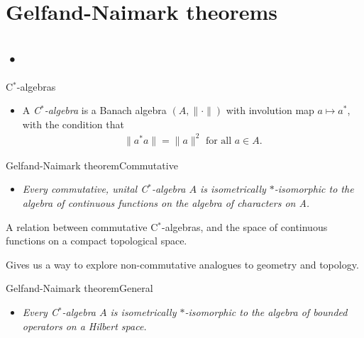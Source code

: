 \documentclass{beamer}
\begin{document}


\section{Gelfand-Naimark theorems}
\subsection{•}
\begin{frame}{C$^\ast$-algebras}
 \begin{itemize}
 	\item A \emph{C$^\ast$-algebra} is a Banach algebra $(A, \| \cdot \|)$ with involution map 
	$a \mapsto a^\ast$, with the condition that
	\begin{align*}
		\|a ^\ast a\| = \|a\|^2 \mbox{ for all } a \in A.
	\end{align*}
	
 \end{itemize}
\end{frame}


\begin{frame}{Gelfand-Naimark theorem}{Commutative}
 \begin{itemize}
 	\item \emph{Every commutative, unital C$^\ast$-algebra $A$ is isometrically $\ast$-isomorphic to the algebra of continuous functions on the algebra of characters on A.} 
 \end{itemize}
 A relation between commutative C$^\ast$-algebras, and the space of continuous functions on a compact topological space.  %
 
  Gives us a way to explore non-commutative analogues to geometry and topology.
\end{frame}




\begin{frame}{Gelfand-Naimark theorem}{General}
 \begin{itemize}
 	\item \emph{Every C$^\ast$-algebra $A$ is isometrically $\ast$-isomorphic to the algebra of bounded operators on a Hilbert space.} 
 \end{itemize} 

\end{frame}
\end{document}
